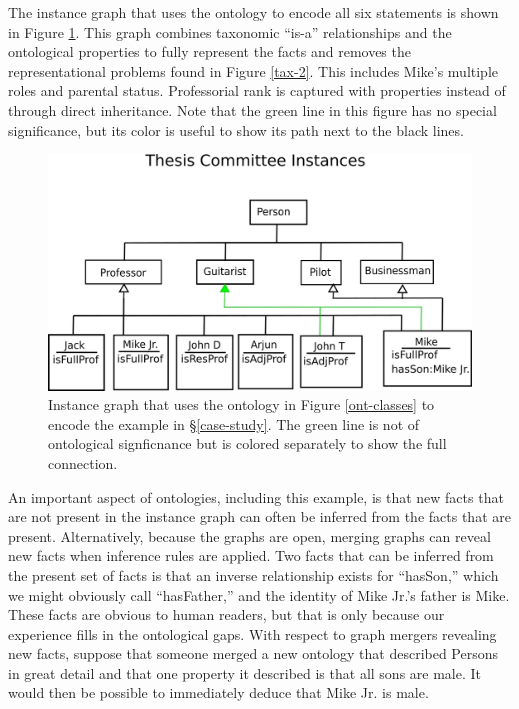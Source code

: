 The instance graph that uses the ontology to encode all six statements is shown
in Figure \ref{ont-instances}. This graph combines taxonomic ``is-a''
relationships and the ontological properties to fully represent the facts
and removes the representational problems found in Figure \ref{tax-2}. This
includes Mike's multiple roles and parental status. Professorial rank is
captured with properties instead of through direct inheritance. Note that the
green line in this figure has no special significance, but its color is useful
to show its path next to the black lines.

\begin{figure}[htbp]
\centering
\includegraphics[width=\textwidth]{figures/tc-ont-instances.png}
\caption{Instance graph that uses the ontology in Figure \ref{ont-classes}
to encode the example in \S \ref{case-study}. The green line is not of
ontological signficnance but is colored separately to show the full connection.}
\label{ont-instances}
\end{figure}

An important aspect of ontologies, including this example, is that new facts
that are not present in the instance graph can often be inferred from the facts that
are present. Alternatively, because the graphs are open, merging graphs can
reveal new facts when inference rules are applied. Two facts that can be
inferred from the present set of facts is that an inverse relationship exists
for ``hasSon,'' which we might obviously call ``hasFather,'' and the identity of
Mike Jr.'s father is Mike. These facts are obvious to human readers, but that is
only because our experience fills in the ontological gaps. With respect to graph
mergers revealing new facts, suppose that someone merged a new ontology that
described Persons in great detail and that one property it described is that
all sons are male. It would then be possible to immediately deduce that Mike Jr.
is male.


